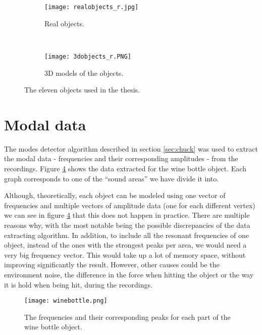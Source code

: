 \begin{figure}[H]
    \centering
    \begin{subfigure}[b]{0.8\textwidth}
        \texttt{[image: realobjects\_r.jpg]}
        \caption{Real objects.}
        \label{fig:real}
    \end{subfigure}
    ~ %
    \begin{subfigure}[b]{0.8\textwidth}
        \texttt{[image: 3dobjects\_r.PNG]}
        \caption{3D models of the objects.}
        \label{fig:models}
    \end{subfigure}
    \caption{The eleven objects used in the thesis.}\label{fig:objects}
\end{figure}

\section{Modal data}
The modes detector algorithm described in section \ref{sec:chuck} was used to extract the modal data - frequencies and their corresponding amplitudes - from the recordings. Figure \ref{fig:bottle_data} shows the data extracted for the wine bottle object. Each graph corresponds to one of the ``sound areas'' we have divide it into.


Although, theoretically, each object can be modeled using one vector of frequencies and multiple vectors of amplitude data (one for each different vertex) we can see in figure \ref{fig:bottle_data} that this does not happen in practice. There are multiple reasons why, with the most notable being the possible discrepancies of the data extracting algorithm. In addition, to include all the resonant frequencies of one object, instead of the ones with the strongest peaks per area, we would need a very big frequency vector. This would take up a lot of memory space, without improving significantly the result. However, other causes could be the environment noise, the difference in the force when hitting the object or the way it is hold when being hit, during the recordings.


\begin{figure}[H]
  \centering
    \texttt{[image: winebottle.png]}
      \caption{The frequencies and their corresponding peaks for each part of the wine bottle object.}\label{fig:bottle_data}
\end{figure}

